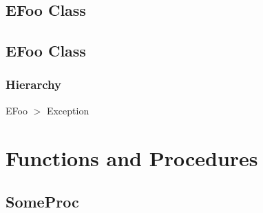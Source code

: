 \documentclass{report}
\newif\ifpdf
\begin{document}
\subsection*{\large{\textbf{EFoo Class}}\normalsize\hspace{1ex}\hrulefill}
\else
\subsection*{EFoo Class}
\fi
\label{ok_tag_params_no_parens.EFoo}
\subsubsection*{\large{\textbf{Hierarchy}}\normalsize\hspace{1ex}\hfill}
EFoo {$>$} Exception
\section{Functions and Procedures}
\ifpdf
\subsection*{\large{\textbf{SomeProc}}\normalsize\hspace{1ex}\hrulefill}
\else
\end{document}
